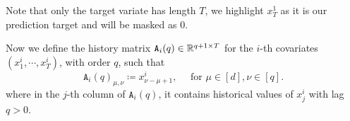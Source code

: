 Note that only the target variate has length $T$, we highlight $x_{T}^1$ as it is our prediction target and will be masked as $0$.

Now we define the history matrix $\mathtt{A}_i(q) \in \mathbb{R}^{q+1 \times T}$ for the $i$-th covariates $(x_1^i, \cdots, x_T^i)$, with order $q$, such that
\begin{equation*}
    \mathtt{A}_i(q)_{\mu, \nu}
    \coloneqq
        x^i_{\nu - \mu + 1},
        \quad
        \text{ for }\mu\in[d], \nu\in[q].
\end{equation*}
where in the $j$-th column of $\mathtt{A}_i(q)$, it contains historical values of $x_j^i$ with lag $q > 0$.

